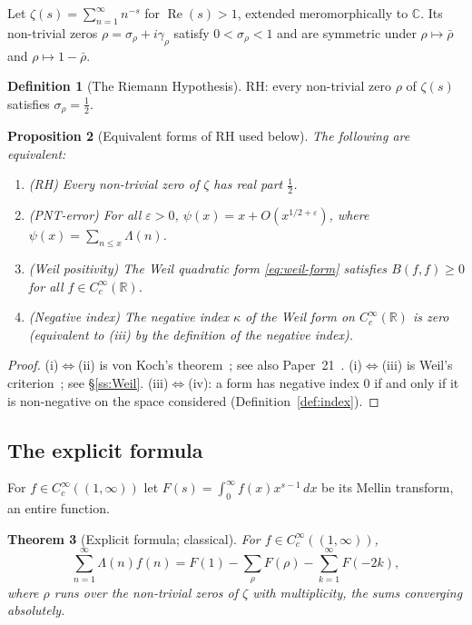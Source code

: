 \documentclass[11pt]{amsart}
\newtheorem{theorem}{Theorem}[section]
\newtheorem{proposition}[theorem]{Proposition}
\theoremstyle{definition}
\newtheorem{definition}[theorem]{Definition}
\theoremstyle{remark}
\newcommand{\RH}{\mathrm{RH}}
\renewcommand{\Re}{\operatorname{Re}}
\newcommand{\half}{\tfrac{1}{2}}
\newcommand{\kap}{\kappa}
\newcommand{\sig}{\sigma}
\newcommand{\gam}{\gamma}
\newcommand{\Lam}{\Lambda}
\newcommand{\eps}{\varepsilon}
\begin{document}
Let $\zeta(s) = \sum_{n=1}^\infty n^{-s}$ for $\Re(s)>1$, extended meromorphically to
$\mathbb{C}$.  Its non-trivial zeros $\rho = \sig_\rho + i\gam_\rho$ satisfy
$0 < \sig_\rho < 1$ and are symmetric under $\rho\mapsto\bar\rho$ and
$\rho\mapsto1-\bar\rho$.

\begin{definition}[The Riemann Hypothesis]
$\RH$: every non-trivial zero $\rho$ of $\zeta(s)$ satisfies $\sig_\rho = \half$.
\end{definition}

\begin{proposition}[Equivalent forms of RH used below]
\label{prop:RH-equiv}
The following are equivalent:
\begin{enumerate}[label=\upshape(\roman*)]
  \item \textup{(RH)} Every non-trivial zero of $\zeta$ has real part $\half$.
  \item \textup{(PNT-error)} For all $\eps>0$,
    $\psi(x) = x + O(x^{1/2+\eps})$, where $\psi(x)=\sum_{n\le x}\Lam(n)$.
  \item \textup{(Weil positivity)} The Weil quadratic form
    \eqref{eq:weil-form} satisfies $B(f,f)\ge0$ for all $f\in C_c^\infty(\mathbb R)$.
  \item \textup{(Negative index)} The negative index $\kap$ of the Weil form on
    $C_c^\infty(\mathbb R)$ is zero (equivalent to \textup{(iii)} by the definition of
    the negative index).
\end{enumerate}
\end{proposition}

\begin{proof}
(i)$\Leftrightarrow$(ii) is von Koch's theorem~\cite{vK01}; see also
Paper~21~\cite[Thm.~6.1]{P21}.
(i)$\Leftrightarrow$(iii) is Weil's criterion~\cite{Weil52,Bom00}; see \S\ref{ss:Weil}.
(iii)$\Leftrightarrow$(iv): a form has negative index $0$ if and only if it is
non-negative on the space considered (Definition~\ref{def:index}).
\end{proof}

\subsection{The explicit formula}
\label{ss:explicit}

For $f\in C_c^\infty((1,\infty))$ let
$F(s)=\int_0^\infty f(x)x^{s-1}\,dx$ be its Mellin transform, an entire function.

\begin{theorem}[Explicit formula; classical]
\label{thm:explicit}
For $f\in C_c^\infty((1,\infty))$,
\begin{equation}
  \label{eq:explicit}
  \sum_{n=1}^\infty \Lam(n)f(n)
  = F(1) - \sum_\rho F(\rho) - \sum_{k=1}^\infty F(-2k),
\end{equation}
where $\rho$ runs over the non-trivial zeros of $\zeta$ with multiplicity, the sums
converging absolutely.
\end{theorem}
\end{document}
